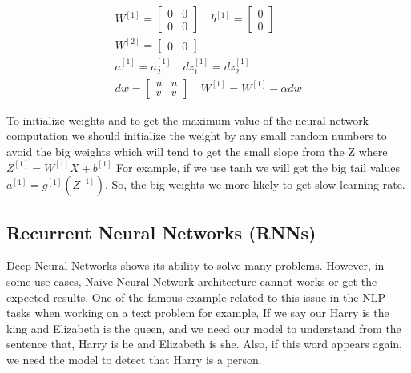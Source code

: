 \begin{subequations}\label{eq:nn_weights_init_zero}
\begin{align}
  W^{[1]} = \begin{bmatrix} 0 & 0\\ 0 & 0 \end{bmatrix} \quad b^{[1]} = \begin{bmatrix} 0 \\ 0 \end{bmatrix} \\
  W^{[2]} = \begin{bmatrix} 0 & 0 \end{bmatrix} \\
  a_1^{[1]} = a_2^{[1]} \quad     dz_1^{[1]} = dz_2^{[1]}\\
  dw = \begin{bmatrix} u & u \\ v & v \end{bmatrix} \quad W^{[1]} = W^{[1]} - \alpha dw
\end{align}
\end{subequations}
     
To initialize weights and to get the maximum value of the neural network computation we should initialize the weight by any small random numbers to avoid the big weights which will tend to get the small slope from the Z where $Z^{[1]}= W^{[1]} X + b^{[1]}$ For example, if we use tanh we will get the big tail values $a^{[1]}= g^{[1]}(Z^{[1]})$. So, the big weights we more likely to get slow learning rate. 
  

\newpage
\subsection{Recurrent Neural Networks (RNNs)}\label{sec_RNN}

Deep Neural Networks shows its ability to solve many problems. However, in some use cases, Naive Neural Network architecture cannot works or get the expected results. One of the famous example related to this issue in the NLP tasks when working on a text problem for example, If we say our Harry is the king and Elizabeth is the queen, and we need our model to understand from the sentence that, Harry is he and Elizabeth is she. Also, if this word appears again, we need the model to detect that Harry is a person.

